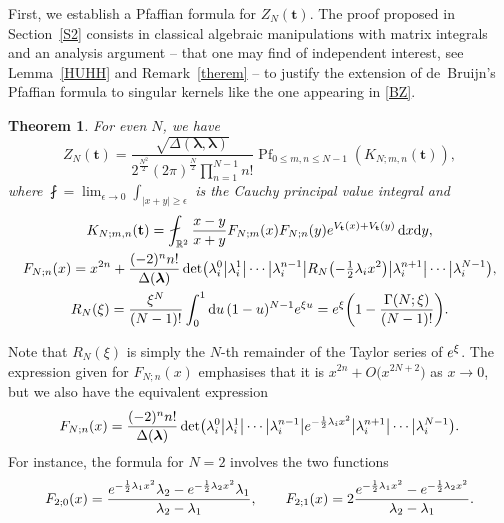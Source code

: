 \documentclass[11pt]{article}
\numberwithin{equation}{section}
\numberwithin{equation}{section}
\newcommand{\dd}{\mathrm{d}}
\newtheorem{Theorem}{Theorem}[section]
\begin{document}
First, we establish a Pfaffian formula for $Z_N(\mathbf{t})$. The proof proposed in Section~\ref{S2} consists in classical algebraic manipulations with matrix integrals and an analysis argument -- that one may find of independent interest, see Lemma~\ref{HUHH} and Remark~\ref{therem} -- to justify the extension of de~Bruijn's Pfaffian formula \cite{deBruijn1955} to singular kernels like the one appearing in \eqref{BZ}.
\begin{Theorem}
\label{th:1} For even $N$, we have
\begin{equation}
\label{BZ} Z_N(\mathbf{t}) = \frac{\sqrt{\Delta(\boldsymbol{\lambda},\boldsymbol{\lambda})}}{2^{\frac{N^2}{2}} (2\pi)^{\frac{N}{2}}\prod_{n = 1}^{N - 1} n!} \operatorname{Pf}_{0 \leq m,n \leq N - 1}(K_{N;m,n}(\mathbf{t})),
\end{equation}
where $\fint = \lim_{\epsilon \rightarrow 0} \int_{|x + y| \geq \epsilon}$ is the Cauchy principal value integral and
\begin{gather*}
 K_{N;m,n}(\mathbf{t}) = \fint_{\mathbb{R}^2} \frac{x - y}{x + y} F_{N;m}(x)F_{N;n}(y) {\rm e}^{V_{\mathbf{t}}(x) + V_{\mathbf{t}}(y)}\,\dd x \dd y, \\
F_{N;n}(x) = x^{2n} + \frac{(-2)^n n!}{\Delta(\boldsymbol{\lambda})}\det\bigl(\lambda_i^0 \big| \lambda_i^1 \big| \cdots \big| \lambda_i^{n - 1} \big| R_N\bigl(-\tfrac{1}{2}\lambda_ix^2\bigr) \big| \lambda_i^{n + 1} \big| \cdots \big| \lambda_i^{N - 1}\bigr), \\
R_N(\xi) = \frac{\xi^N}{(N - 1)!} \int_{0}^{1} \dd u\, (1 - u)^{N - 1} {\rm e}^{\xi u} = {\rm e}^{\xi}\biggl(1 - \frac{\Gamma(N;\xi)}{(N - 1)!}\biggr).
\end{gather*}
\end{Theorem}

Note that $R_N(\xi)$ is simply the $N$-th remainder of the Taylor series of ${\rm e}^{\xi}$. The expression given for $F_{N;n}(x)$ emphasises that it is $x^{2n} + O\bigl(x^{2N + 2}\bigr)$ as $x \rightarrow 0$, but we also have the equivalent expression
\[
F_{N;n}(x) = \frac{(-2)^n n!}{\Delta(\boldsymbol{\lambda})} \det\bigl(\lambda_i^0 \big| \lambda_i^1 \big| \cdots \big| \lambda_i^{n - 1} \big| {\rm e}^{-\frac{1}{2}\lambda_i x^2} \big| \lambda_i^{n + 1} \big| \cdots \big| \lambda_i^{N - 1}\bigr).
\]
For instance, the formula for $N = 2$ involves the two functions
\[
F_{2;0}(x) = \frac{{\rm e}^{-\frac{1}{2}\lambda_1 x^2} \lambda_2 - {\rm e}^{-\frac{1}{2}\lambda_2 x^2}\lambda_1}{\lambda_2 - \lambda_1}, \qquad F_{2;1}(x) = 2 \frac{{\rm e}^{-\frac{1}{2}\lambda_1 x^2} - {\rm e}^{-\frac{1}{2}\lambda_2 x^2}}{\lambda_2 - \lambda_1} .
\]
\end{document}
